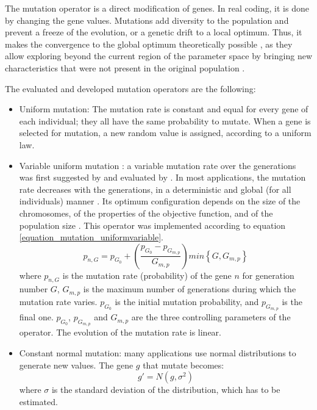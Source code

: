 \documentclass[twocol]{ametsoc}
\begin{document}
The mutation operator is a direct modification of genes. In real coding, it is done by changing the gene values. Mutations add diversity to the population and prevent a freeze of the evolution, or a genetic drift to a local optimum. Thus, it makes the convergence to the global optimum theoretically possible \citep{Beasley1993a}, as they allow exploring beyond the current region of the parameter space by bringing new characteristics that were not present in the original population \citep{Haupt2004}. 

The evaluated and developed mutation operators are the following:

\begin{itemize}
	\item Uniform mutation: The mutation rate is constant and equal for every gene of each individual; they all have the same probability to mutate. When a gene is selected for mutation, a new random value is assigned, according to a uniform law.
	
	\item Variable uniform mutation \citep{Fogarty1989}: a variable mutation rate over the generations was first suggested by \citet{Holland1992b} and evaluated by \citet{Fogarty1989}. In most applications, the mutation rate decreases with the generations, in a deterministic and global (for all individuals) manner \citep{Back1992b}. Its optimum configuration depends on the size of the chromosomes, of the properties of the objective function, and of the population size \citep{Back1992b}. This operator was implemented according to equation \ref{equation_mutation_uniformvariable}.
	\begin{equation}
	p_{n,G} = p_{G_{0}}+\left( \dfrac{p_{G_{0}}-p_{G_{m,p}}}{G_{m,p}} \right) min\left\lbrace G,G_{m,p}\right\rbrace 
	\label{equation_mutation_uniformvariable}
	\end{equation}
	where $p_{n,G}$ is the mutation rate (probability) of the gene $n$ for generation number $G$, $G_{m,p}$ is the maximum number of generations during which the mutation rate varies. $p_{G_{0}}$ is the initial mutation probability, and $p_{G_{m,p}}$ is the final one. $p_{G_{0}}$, $p_{G_{m,p}}$ and $G_{m,p}$ are the three controlling parameters of the operator. The evolution of the mutation rate is linear.
	
	\item Constant normal mutation: many applications use normal distributions to generate new values. The gene $g$ that mutate becomes:
	\begin{equation}
	g' = N(g,\sigma^{2})
	\label{equation_mutating_normal_distribution}
	\end{equation}
	where $\sigma$ is the standard deviation of the distribution, which has to be estimated.
	

\end{itemize}
\end{document}

